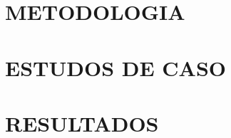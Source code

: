 \documentclass[
        oneside,      %
        english,			
        brazil			 
        ]{configcefetmglpd}
\begin{document}
\chapter{METODOLOGIA}





\chapter{ESTUDOS DE CASO}


\chapter{RESULTADOS}








\postextual



\appendix


\end{document}
